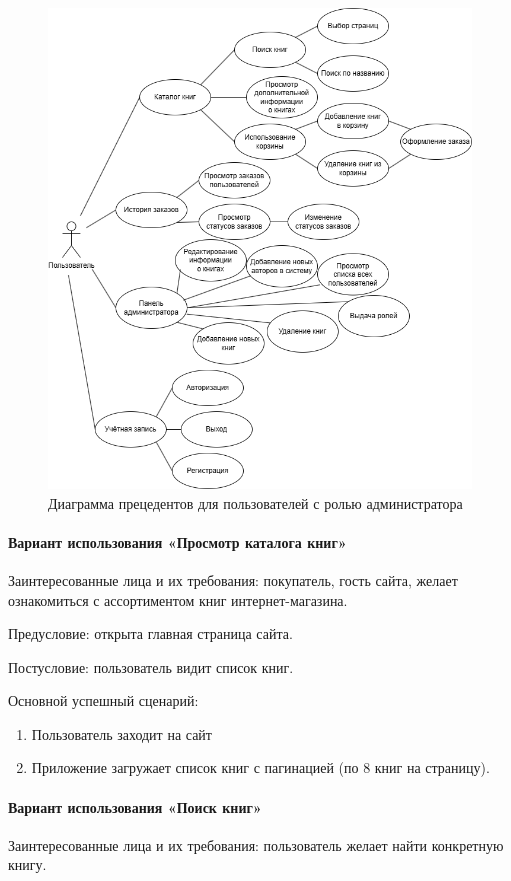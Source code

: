 \begin{figure}[H]
	\centering
	\includegraphics[width=0.7\linewidth]{"images/Администраторы"}
	\caption{Диаграмма прецедентов для пользователей с ролью администратора}
	\label{fig:--}
\end{figure}


\paragraph{Вариант использования «Просмотр каталога книг»}

Заинтересованные лица и их требования: покупатель, гость сайта, желает ознакомиться с ассортиментом книг интернет-магазина.

Предусловие: открыта главная страница сайта.

Постусловие: пользователь видит список книг.

Основной успешный сценарий:

\begin{enumerate}
	\item Пользователь заходит на сайт
	\item Приложение загружает список книг с пагинацией (по 8 книг на страницу).
\end{enumerate}


\paragraph{Вариант использования «Поиск книг»}

Заинтересованные лица и их требования: пользователь желает найти конкретную книгу.

